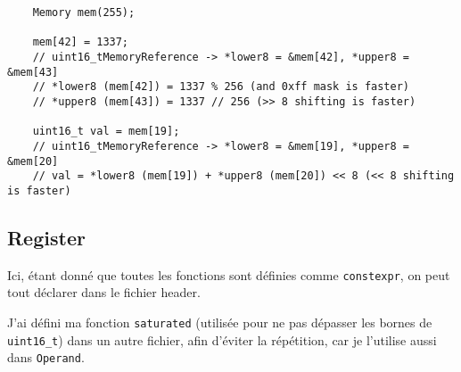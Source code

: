 \documentclass{article}
\begin{document}
\begin{verbatim}
    Memory mem(255);

    mem[42] = 1337;
    // uint16_tMemoryReference -> *lower8 = &mem[42], *upper8 = &mem[43]
    // *lower8 (mem[42]) = 1337 % 256 (and 0xff mask is faster)
    // *upper8 (mem[43]) = 1337 // 256 (>> 8 shifting is faster)

    uint16_t val = mem[19];
    // uint16_tMemoryReference -> *lower8 = &mem[19], *upper8 = &mem[20]
    // val = *lower8 (mem[19]) + *upper8 (mem[20]) << 8 (<< 8 shifting is faster)
\end{verbatim}

\subsection{Register}

Ici, étant donné que toutes les fonctions sont définies comme \texttt{constexpr}, on peut tout déclarer dans le fichier header.

J'ai défini ma fonction \texttt{saturated} (utilisée pour ne pas dépasser les bornes de \texttt{uint16\_t}) dans un autre fichier, afin d'éviter la répétition, car je l'utilise aussi dans \texttt{Operand}.
\end{document}
